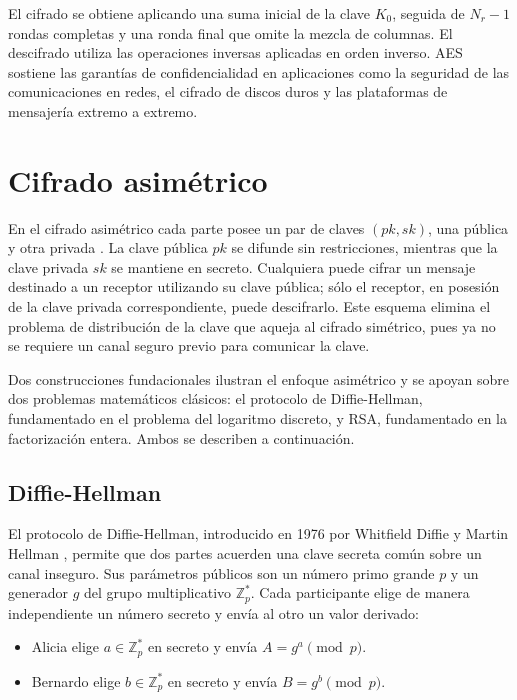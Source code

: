 El cifrado se obtiene aplicando una suma inicial de la clave $K_0$, seguida de $N_r - 1$ rondas completas y una ronda final que omite la mezcla de columnas. El descifrado utiliza las operaciones inversas aplicadas en orden inverso. AES sostiene las garantías de confidencialidad en aplicaciones como la seguridad de las comunicaciones en redes, el cifrado de discos duros y las plataformas de mensajería extremo a extremo.

\section{Cifrado asimétrico}

En el cifrado asimétrico cada parte posee un par de claves $(pk, sk)$, una pública y otra privada \cite{KatzLindell}. La clave pública $pk$ se difunde sin restricciones, mientras que la clave privada $sk$ se mantiene en secreto. Cualquiera puede cifrar un mensaje destinado a un receptor utilizando su clave pública; sólo el receptor, en posesión de la clave privada correspondiente, puede descifrarlo. Este esquema elimina el problema de distribución de la clave que aqueja al cifrado simétrico, pues ya no se requiere un canal seguro previo para comunicar la clave.

Dos construcciones fundacionales ilustran el enfoque asimétrico y se apoyan sobre dos problemas matemáticos clásicos: el protocolo de Diffie-Hellman, fundamentado en el problema del logaritmo discreto, y RSA, fundamentado en la factorización entera. Ambos se describen a continuación.

\subsection{Diffie-Hellman}

El protocolo de Diffie-Hellman, introducido en 1976 por Whitfield Diffie y Martin Hellman \cite{DH76}, permite que dos partes acuerden una clave secreta común sobre un canal inseguro. Sus parámetros públicos son un número primo grande $p$ y un generador $g$ del grupo multiplicativo $\mathbb{Z}_p^*$. Cada participante elige de manera independiente un número secreto y envía al otro un valor derivado:

\begin{itemize}
    \item Alicia elige $a \in \mathbb{Z}_p^*$ en secreto y envía $A = g^a \pmod{p}$.
    \item Bernardo elige $b \in \mathbb{Z}_p^*$ en secreto y envía $B = g^b \pmod{p}$.
\end{itemize}

